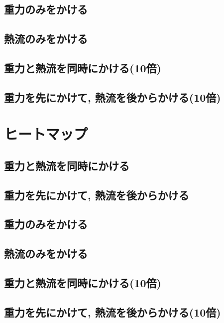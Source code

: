 

\subsection{重力のみをかける}



\subsection{熱流のみをかける}



\subsection{重力と熱流を同時にかける(10倍)}



\subsection{重力を先にかけて, 熱流を後からかける(10倍)}




\section{ヒートマップ}

\subsection{重力と熱流を同時にかける}



\subsection{重力を先にかけて, 熱流を後からかける}



\subsection{重力のみをかける}



\subsection{熱流のみをかける}



\subsection{重力と熱流を同時にかける(10倍)}



\subsection{重力を先にかけて, 熱流を後からかける(10倍)}



